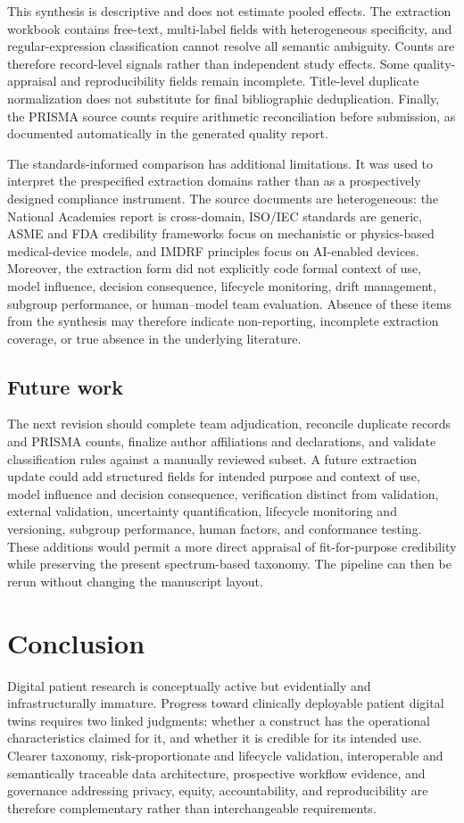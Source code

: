 This synthesis is descriptive and does not estimate pooled effects. The extraction workbook contains free-text, multi-label fields with heterogeneous specificity, and regular-expression classification cannot resolve all semantic ambiguity. Counts are therefore record-level signals rather than independent study effects. Some quality-appraisal and reproducibility fields remain incomplete. Title-level duplicate normalization does not substitute for final bibliographic deduplication. Finally, the PRISMA source counts require arithmetic reconciliation before submission, as documented automatically in the generated quality report.

The standards-informed comparison has additional limitations. It was used to interpret the prespecified extraction domains rather than as a prospectively designed compliance instrument. The source documents are heterogeneous: the National Academies report is cross-domain, ISO/IEC standards are generic, ASME and FDA credibility frameworks focus on mechanistic or physics-based medical-device models, and IMDRF principles focus on AI-enabled devices. Moreover, the extraction form did not explicitly code formal context of use, model influence, decision consequence, lifecycle monitoring, drift management, subgroup performance, or human--model team evaluation. Absence of these items from the synthesis may therefore indicate non-reporting, incomplete extraction coverage, or true absence in the underlying literature.

\subsection{Future work}

The next revision should complete team adjudication, reconcile duplicate records and PRISMA counts, finalize author affiliations and declarations, and validate classification rules against a manually reviewed subset. A future extraction update could add structured fields for intended purpose and context of use, model influence and decision consequence, verification distinct from validation, external validation, uncertainty quantification, lifecycle monitoring and versioning, subgroup performance, human factors, and conformance testing. These additions would permit a more direct appraisal of fit-for-purpose credibility while preserving the present spectrum-based taxonomy. The pipeline can then be rerun without changing the manuscript layout.

\section{Conclusion}

Digital patient research is conceptually active but evidentially and infrastructurally immature. Progress toward clinically deployable patient digital twins requires two linked judgments: whether a construct has the operational characteristics claimed for it, and whether it is credible for its intended use. Clearer taxonomy, risk-proportionate and lifecycle validation, interoperable and semantically traceable data architecture, prospective workflow evidence, and governance addressing privacy, equity, accountability, and reproducibility are therefore complementary rather than interchangeable requirements.
